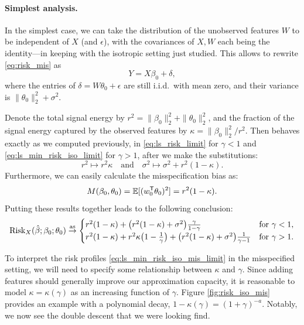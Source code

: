 \documentclass{article}
\begin{document}
\paragraph{Simplest analysis.}

In the simplest case, we can take the distribution of the unobserved features
$W$ to be independent of $X$ (and $\epsilon$), with the covariances of $X,W$
each being the identity---in keeping with the isotropic setting just
studied. This allows to rewrite \eqref{eq:risk_mis} as 
\[
Y = X\beta_0 + \delta,
\]
where the entries of $\delta = W\theta_0 + \epsilon$ are still i.i.d.\ with mean
zero, and their variance is $\|\theta_0\|_2^2 + \sigma^2$. 

Denote the total signal energy by $r^2=\|\beta_0\|_2^2+\|\theta_0\|_2^2$, and
the fraction of the signal energy captured by the observed features by
$\kappa=\|\beta_0\|_2^2 / r^2$. Then 
behaves exactly as we computed previously, in \eqref{eq:ls_risk_limit} for
$\gamma<1$ and \eqref{eq:ls_min_risk_iso_limit} for $\gamma>1$, after we make
the substitutions:    
\[
r^2 \mapsto r^2 \kappa \quad \text{and} \quad
\sigma^2 \mapsto \sigma^2 + r^2 (1-\kappa).
\]
Furthermore, we can easily calculate the misspecification bias as: 
\[
M(\beta_0, \theta_0) = \mathbb{E}[(w_0^{\mathsf{T}} \theta_0)^2] = r^2 (1-\kappa). 
\]
Putting these results together leads to the following conclusion:
\begin{equation}
\label{eq:ls_min_risk_iso_mis_limit}
\mathrm{Risk}_X(\hat{\beta}; \beta_0; \theta_0) \overset{\mathrm{as}}{\to} 
\begin{cases}
r^2(1-\kappa) + \big(r^2(1-\kappa) + \sigma^2\big) 
\frac{\gamma}{1-\gamma} & \text{for $\gamma < 1$}, \\
r^2(1-\kappa) + r^2 \kappa \big(1-\frac{1}{\gamma}\big) 
+ \big(r^2(1-\kappa) + \sigma^2\big) \frac{1}{\gamma-1} &  
\text{for $\gamma > 1$}.
\end{cases}
\end{equation}

To interpret the risk profiles \eqref{eq:ls_min_risk_iso_mis_limit} in the
misspecified setting, we will need to specify some relationship between $\kappa$
and $\gamma$. Since adding features should generally improve our approximation
capacity, it is reasonable to model $\kappa=\kappa(\gamma)$ as an increasing
function of $\gamma$. Figure \ref{fig:risk_iso_mis} provides an example with a 
polynomial decay, $1-\kappa(\gamma) = (1+\gamma)^{-a}$. Notably, we now see the
double descent that we were looking find.  
\end{document}
